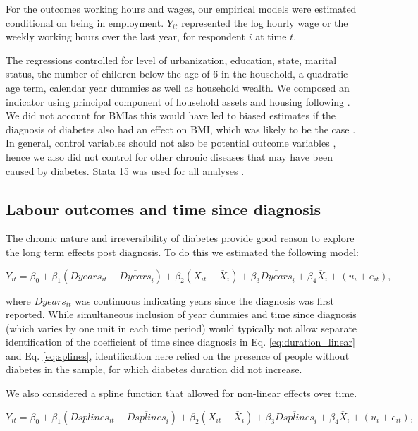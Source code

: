 \documentclass[12pt,english]{article}
\begin{document}
For the outcomes working hours and wages, our empirical models were estimated conditional on being in employment. $Y_{it}$ represented the log hourly wage or the weekly working hours over the last year, for respondent $i$ at time $t$.

The regressions controlled for level of urbanization, education, state, marital status, the number of children below the age of 6  in the household, a quadratic age term, calendar year dummies as well as household wealth. We composed an indicator using principal component of household assets and housing following \textcite{Filmer2001}. We did not account for \ac{BMI}as this would have led to biased estimates if the diagnosis of diabetes also had an effect on \ac{BMI}, which was likely to be the case \parencite{Slade2012,DeFineOlivarius2015}. In general, control variables should not also be potential outcome variables \parencite{Angrist2009a}, hence we also did not control for other chronic diseases that may have been caused by diabetes. Stata 15 was used for all analyses \parencite{StataCorp2017}.


\subsection{Labour outcomes and time since diagnosis}

The chronic nature and irreversibility of diabetes provide good reason to explore the long term effects post diagnosis. To do this we estimated the following model:

\begin{equation}
Y_{it}=\beta_{0}+\beta_{1}(Dyears_{it}-\overline{Dyears}_{i})+\beta_{2}(X_{it}-\overline{X}_i)+\beta_{3}\overline{Dyears}_{i}+\beta_{4}\overline{X}_i+(u_{i}+e_{it}),\label{eq:duration_linear}
\end{equation}

where $Dyears_{it}$ was continuous indicating years since the diagnosis was first reported. While simultaneous inclusion of year dummies and time since diagnosis (which varies by one unit in each time period) would typically not allow separate identification of the coefficient of time since diagnosis in Eq. \ref{eq:duration_linear} and Eq.  \ref{eq:splines}, identification here relied on the presence of people without diabetes in the sample, for which diabetes duration did not increase.

We also considered a spline function that allowed for non-linear effects over time.

\begin{equation}
Y_{it}=\beta_{0}+\beta_{1}(Dsplines_{it}-\overline{Dsplines}_{i})+\beta_{2}(X_{it}-\overline{X}_i)+\beta_{3}\overline{Dsplines}_{i}+\beta_{4}\overline{X}_i+(u_{i}+e_{it}),\label{eq:splines}
\end{equation}
\end{document}
